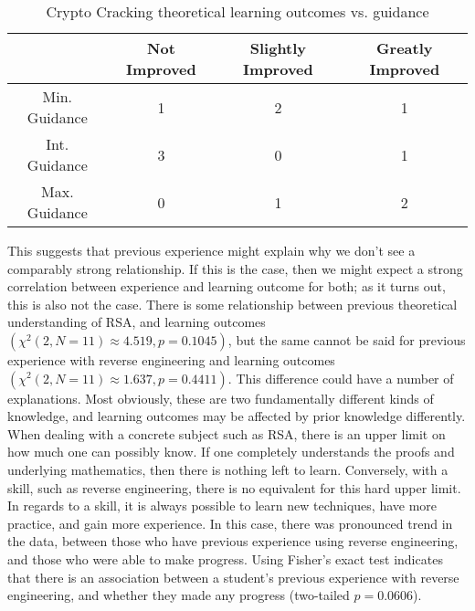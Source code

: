         \begin{table}
        \begin{center}
            \begin{tabular}{|c|c|c|c|}
                \hline
                    & Not Improved & Slightly Improved & Greatly Improved \\
                \hline
                Min. Guidance & 1 & 2 & 1\\
                \hline
                Int. Guidance & 3 & 0 & 1\\
                \hline
                Max. Guidance & 0 & 1 & 2\\
                \hline
            \end{tabular}

            \caption{Crypto Cracking theoretical learning outcomes vs. guidance}\label{tab:cc-tLO-v-g}
        \end{center}
        \end{table}

        This suggests that previous experience might explain why we don't see a comparably strong relationship. 
        If this is the case, then we might expect a strong correlation between experience and learning outcome for both; 
        as it turns out, this is also not the case. 
        There is some relationship between previous theoretical understanding of RSA, and learning outcomes $(\chi^2(2, N=11)\approx4.519,  p = 0.1045)$, but the same cannot be said for previous experience with reverse engineering and learning outcomes $(\chi^2(2, N=11)\approx1.637,  p = 0.4411)$. 
        This difference could have a number of explanations. 
        Most obviously, these are two fundamentally different kinds of knowledge, and learning outcomes may be affected by prior knowledge differently. 
        When dealing with a concrete subject such as RSA, there is an upper limit on how much one can possibly know. 
        If one completely understands the proofs and underlying mathematics, then there is nothing left to learn. 
        Conversely, with a skill, such as reverse engineering, there is no equivalent for this hard upper limit. 
        In regards to a skill, it is always possible to learn new techniques, have more practice, and gain more experience. 
        In this case, there was pronounced trend in the data, between those who have previous experience using reverse engineering, and those who were able to make progress. 
        Using Fisher's exact test indicates that there is an association between a student's previous experience with reverse engineering, and whether they made any progress (two-tailed $p=0.0606$). 

